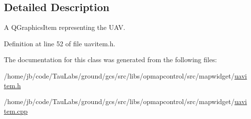 \subsection{\-Detailed \-Description}
\-A \-Q\-Graphics\-Item representing the \-U\-A\-V. 

\-Definition at line 52 of file uavitem.\-h.



\-The documentation for this class was generated from the following files\-:\begin{DoxyCompactItemize}
\item 
/home/jb/code/\-Tau\-Labs/ground/gcs/src/libs/opmapcontrol/src/mapwidget/\hyperlink{uavitem_8h}{uavitem.\-h}\item 
/home/jb/code/\-Tau\-Labs/ground/gcs/src/libs/opmapcontrol/src/mapwidget/\hyperlink{uavitem_8cpp}{uavitem.\-cpp}\end{DoxyCompactItemize}

